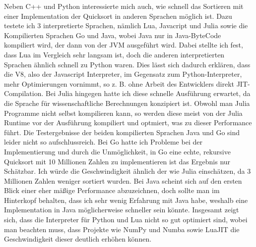 \documentclass[10pt,a4paper]{article}
\begin{document}
\begin{bchart}[min=0, max=15, scale=2.1]
    \smallskip
    \smallskip
    \smallskip
    \smallskip
    \smallskip
    \smallskip
    \smallskip
    \smallskip
\end{bchart}

Neben C++ und Python interessierte mich auch, wie schnell das Sortieren mit einer Implementation der Quicksort
in anderen Sprachen möglich ist. Dazu testete ich 3 interpretierte Sprachen, nämlich Lua, Javacript und Julia sowie die
Kompilierten Sprachen Go und Java, wobei Java nur in Java-ByteCode kompiliert wird, der dann von der JVM ausgeführt wird.
Dabei stellte ich fest, dass Lua im Vergleich sehr langsam ist, doch die anderen interpretierten Sprachen ähnlich schnell zu Python waren.
Dies lässt sich dadurch erklären, dass die V8, also der Javascript Interpreter, im Gegensatz zum Python-Interpreter,
mehr Optimierungen vornimmt, so z. B. ohne Arbeit des Entwicklers direkt JIT-Compilation. Bei Julia hingegen hatte ich diese
schnelle Ausführung erwartet, da die Sprache für wissenschaftliche Berechnungen konzipiert ist. Obwohl man Julia Programme nicht selbst kompilieren kann,
so werden diese meist von der Julia Runtime vor der Ausführung kompiliert und optmiert, was zu dieser Performance führt.
Die Testergebnisse der beiden kompilierten Sprachen Java und Go sind leider nicht so aufschlussreich.
Bei Go hatte ich Probleme bei der Implementierung und durch die Unmöglichkeit, in Go eine echte, rekursive Quicksort mit 10 Millionen Zahlen
zu implementieren ist das Ergebnis nur Schätzbar. Ich würde die Geschwindigkeit ähnlich der wie Julia einschätzen, da 3 Millionen Zahlen weniger sortiert wurden.
Bei Java scheint sich auf den ersten Blick einer eher mäßige Performance abzuzeichnen, doch sollte man im Hinterkopf behalten,
dass ich sehr wenig Erfahrung mit Java habe, weshalb eine Implementation in Java möglicherweise schneller sein könnte.
Insgesamt zeigt sich, dass die Interpreter für Python und Lua nicht so gut optimiert sind, wobei man beachten muss, dass Projekte wie NumPy und Numba sowie LuaJIT
die Geschwindigkeit dieser deutlich erhöhen können.
\end{document}
